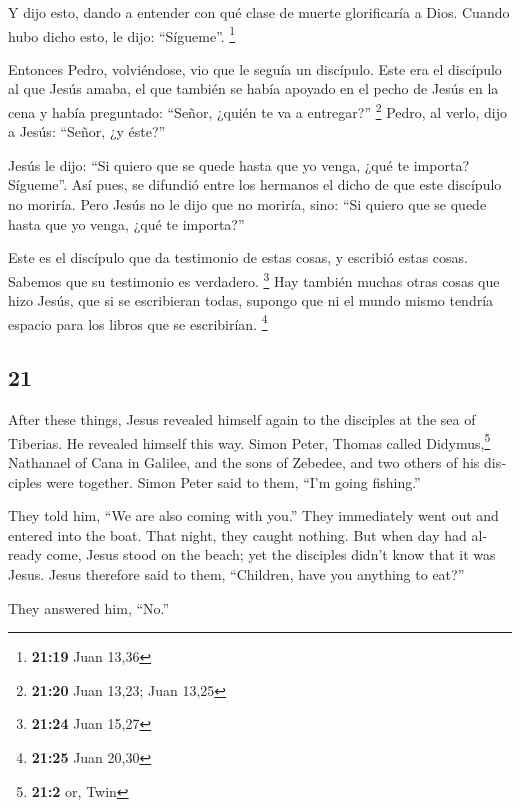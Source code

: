 \begin{paracol}{2}
 Y dijo esto, dando a entender con qué clase de muerte
glorificaría a Dios. Cuando hubo dicho esto, le dijo: ``Sígueme''.
\footnote{\textbf{21:19} Juan 13,36}

 Entonces Pedro, volviéndose, vio que le seguía un
discípulo. Este era el discípulo al que Jesús amaba, el que también se
había apoyado en el pecho de Jesús en la cena y había preguntado:
``Señor, ¿quién te va a entregar?'' \footnote{\textbf{21:20} Juan 13,23;
  Juan 13,25}  Pedro, al verlo, dijo a Jesús: ``Señor, ¿y
éste?''

 Jesús le dijo: ``Si quiero que se quede hasta que yo
venga, ¿qué te importa? Sígueme''.  Así pues, se difundió
entre los hermanos el dicho de que este discípulo no moriría. Pero Jesús
no le dijo que no moriría, sino: ``Si quiero que se quede hasta que yo
venga, ¿qué te importa?''

 Este es el discípulo que da testimonio de estas cosas, y
escribió estas cosas. Sabemos que su testimonio es verdadero.
\footnote{\textbf{21:24} Juan 15,27}  Hay también muchas
otras cosas que hizo Jesús, que si se escribieran todas, supongo que ni
el mundo mismo tendría espacio para los libros que se escribirían.
\footnote{\textbf{21:25} Juan 20,30} \switchcolumn
\begin{otherlanguage}{english}

\hypertarget{section-41}{%
\section{21}\label{section-41}}

 After these things, Jesus revealed himself again to the
disciples at the sea of Tiberias. He revealed himself this way.
 Simon Peter, Thomas called Didymus,\footnote{\textbf{21:2}
  or, Twin} Nathanael of Cana in Galilee, and the sons of Zebedee, and
two others of his disciples were together.  Simon Peter
said to them, ``I'm going fishing.''

They told him, ``We are also coming with you.'' They immediately went
out and entered into the boat. That night, they caught nothing.
 But when day had already come, Jesus stood on the beach;
yet the disciples didn't know that it was Jesus.  Jesus
therefore said to them, ``Children, have you anything to eat?''

They answered him, ``No.''


\end{otherlanguage}
\end{paracol}

